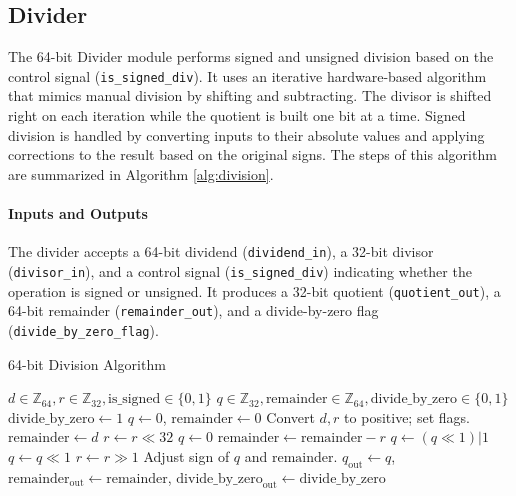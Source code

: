 \documentclass[12pt]{article}
\begin{document}
\subsection*{Divider}

The 64-bit Divider module performs signed and unsigned division based on the control signal (\texttt{is\_signed\_div}). It uses an iterative hardware-based algorithm that mimics manual division by shifting and subtracting. The divisor is shifted right on each iteration while the quotient is built one bit at a time. Signed division is handled by converting inputs to their absolute values and applying corrections to the result based on the original signs. The steps of this algorithm are summarized in Algorithm \ref{alg:division}.

\paragraph{Inputs and Outputs}
The divider accepts a 64-bit dividend (\texttt{dividend\_in}), a 32-bit divisor (\texttt{divisor\_in}), and a control signal (\texttt{is\_signed\_div}) indicating whether the operation is signed or unsigned. It produces a 32-bit quotient (\texttt{quotient\_out}), a 64-bit remainder (\texttt{remainder\_out}), and a divide-by-zero flag (\texttt{divide\_by\_zero\_flag}).

\begin{algorithm}[ht!]
    \caption{64-bit Division Algorithm}
    \label{alg:division}
    \begin{algorithmic}[1]
        \REQUIRE $d \in \mathbb{Z}_{64}, r \in \mathbb{Z}_{32}, \text{is\_signed} \in \{0, 1\}$
        \ENSURE $q \in \mathbb{Z}_{32}, \text{remainder} \in \mathbb{Z}_{64}, \text{divide\_by\_zero} \in \{0, 1\}$
            \STATE $\text{divide\_by\_zero} \leftarrow 1$
            \STATE $q \leftarrow 0$, $\text{remainder} \leftarrow 0$
        \ELSE
                \STATE Convert $d, r$ to positive; set flags.
            \ENDIF
            \STATE $\text{remainder} \leftarrow d$
            \STATE $r \leftarrow r \ll 32$
            \STATE $q \leftarrow 0$
                    \STATE $\text{remainder} \leftarrow \text{remainder} - r$
                    \STATE $q \leftarrow (q \ll 1) | 1$
                \ELSE
                    \STATE $q \leftarrow q \ll 1$
                \ENDIF
                \STATE $r \leftarrow r \gg 1$
            \ENDFOR
                \STATE Adjust sign of $q$ and $\text{remainder}$.
            \ENDIF
        \ENDIF
        \STATE $q_{\text{out}} \leftarrow q$, $\text{remainder}_{\text{out}} \leftarrow \text{remainder}$, $\text{divide\_by\_zero}_{\text{out}} \leftarrow \text{divide\_by\_zero}$
    \end{algorithmic}
\end{algorithm}
\end{document}
